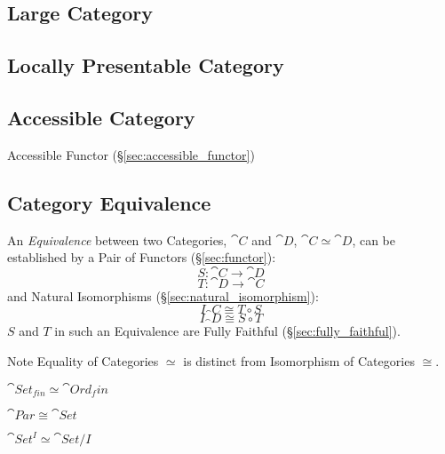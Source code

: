 \subsection{Large Category}\label{sec:large_category}

\subsection{Locally Presentable Category}\label{sec:locally_presentable}

\subsection{Accessible Category}\label{sec:accessible_category}

Accessible Functor (\S\ref{sec:accessible_functor})



\subsection{Category Equivalence}\label{sec:category_equivalence}

An \emph{Equivalence} between two Categories, $\cat{C}$ and
$\cat{D}$, $\cat{C} \simeq \cat{D}$, can be established by a
Pair of Functors (\S\ref{sec:functor}):
\[
  S : \cat{C} \rightarrow \cat{D}
\]\[
  T : \cat{D} \rightarrow \cat{C}
\]
and Natural Isomorphisms (\S\ref{sec:natural_isomorphism}):
\[
  I_\cat{C} \cong T \circ S
\]\[
  I_\cat{D} \cong S \circ T
\]
$S$ and $T$ in such an Equivalence are Fully Faithful
(\S\ref{sec:fully_faithful}).

\fist Note Equality of Categories $\simeq$ is distinct from
Isomorphism of Categories $\cong$.

$\cat{Set}_{fin} \simeq \cat{Ord}_fin$

$\cat{Par} \cong \cat{Set}$

$\cat{Set}^I \simeq \cat{Set}/I$

